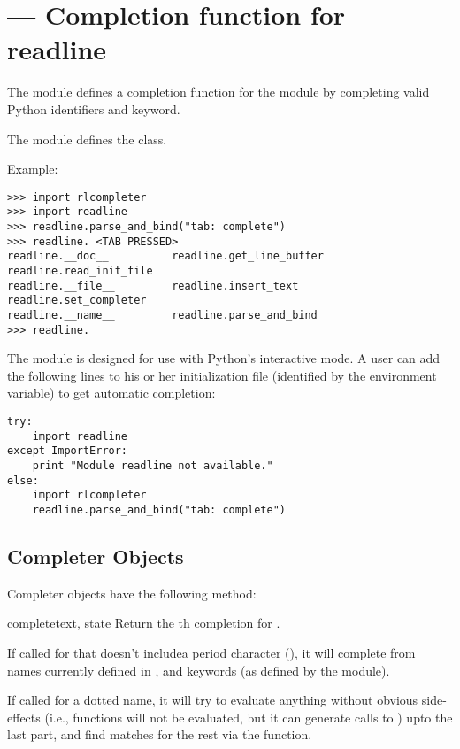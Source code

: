 \section{ ---
         Completion function for readline}


The  module defines a completion function for
the  module by completing valid Python identifiers and
keyword.

The  module defines the  class.

Example:

\begin{verbatim}
>>> import rlcompleter
>>> import readline
>>> readline.parse_and_bind("tab: complete")
>>> readline. <TAB PRESSED>
readline.__doc__          readline.get_line_buffer  readline.read_init_file
readline.__file__         readline.insert_text      readline.set_completer
readline.__name__         readline.parse_and_bind
>>> readline.
\end{verbatim}

The  module is designed for use with Python's
interactive mode.  A user can add the following lines to his or her
initialization file (identified by the 
environment variable) to get automatic  completion:

\begin{verbatim}
try:
    import readline
except ImportError:
    print "Module readline not available."
else:
    import rlcompleter
    readline.parse_and_bind("tab: complete")
\end{verbatim}


\subsection{Completer Objects \label{completer-objects}}

Completer objects have the following method:

\begin{methoddesc}[Completer]{complete}{text, state}
Return the th completion for .

If called for  that doesn't includea period character
(), it will complete from names currently defined in
,  and keywords (as defined
by the  module).

If called for a dotted name, it will try to evaluate anything without
obvious side-effects (i.e., functions will not be evaluated, but it
can generate calls to ) upto the last part, and
find matches for the rest via the  function.
\end{methoddesc}

